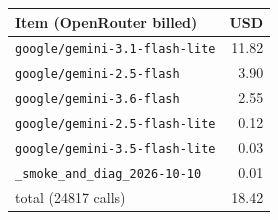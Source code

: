 \begin{tabular}{lr}
\toprule
\textbf{Item (OpenRouter billed)} & \textbf{USD} \\
\midrule
\texttt{google/gemini-3.1-flash-lite} & 11.82 \\
\texttt{google/gemini-2.5-flash} & 3.90 \\
\texttt{google/gemini-3.6-flash} & 2.55 \\
\texttt{google/gemini-2.5-flash-lite} & 0.12 \\
\texttt{google/gemini-3.5-flash-lite} & 0.03 \\
\texttt{\_smoke\_and\_diag\_2026-10-10} & 0.01 \\
\midrule
total (24817 calls) & 18.42 \\
\bottomrule
\end{tabular}
